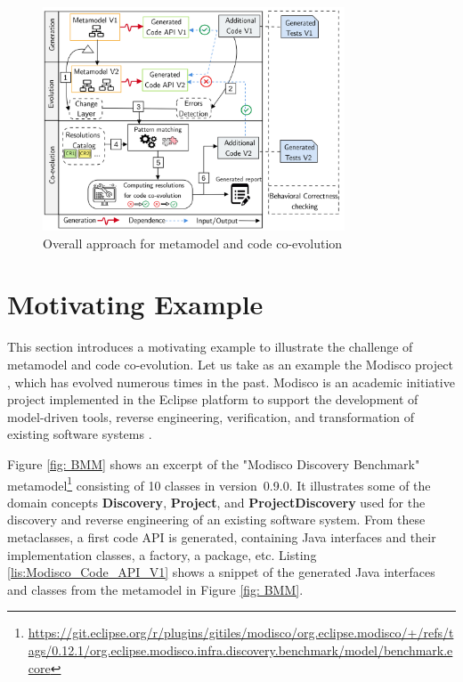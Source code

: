 \begin{figure}[t]\centering%
	\centering
	\includegraphics[width=0.8\textwidth]{./pics/chapter1pics/ApproachV5.png}
	\caption{Overall approach for metamodel and code co-evolution}
	\label{fig:overallapproach}
	\vspace{-1em}
\end{figure}
\label{sec: ap1_changedetection}

\section{Motivating Example}\label{example}

This section introduces a motivating example to illustrate the challenge of metamodel and code co-evolution. 
Let us take as an example the Modisco project \cite{MDTModisco}, which has evolved numerous times in the past. Modisco is an academic initiative project implemented in the Eclipse platform to support the development of model-driven tools, reverse engineering, verification, and transformation of existing software systems \cite{bruneliere2010modisco,bruneliere2014modisco}.


Figure \ref{fig: BMM} shows an excerpt of the "Modisco Discovery Benchmark" metamodel\footnote{\url{https://git.eclipse.org/r/plugins/gitiles/modisco/org.eclipse.modisco/+/refs/tags/0.12.1/org.eclipse.modisco.infra.discovery.benchmark/model/benchmark.ecore}} consisting of 10 classes in version~0.9.0.
It illustrates some of the domain concepts \textbf{Discovery}, \textbf{Project}, and \textbf{ProjectDiscovery}  used for the discovery and reverse engineering of an existing software system. 
From these metaclasses, a first code API is generated, containing Java interfaces and their implementation classes, a factory, a package, etc. Listing \ref{lis:Modisco_Code_API_V1} shows a snippet of the generated Java interfaces and classes from the metamodel in Figure \ref{fig: BMM}. 

